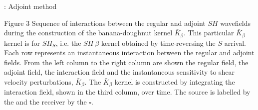 

\begin{frame}[c]{\titleprefix: Adjoint method}

  \centering

  \begin{minipage}{0.5\textwidth}
  \end{minipage}
  \hspace{0.5cm}
  \begin{minipage}{0.42\textwidth}
    \tiny
    \begin{figureblock}{Figure 3}
      Sequence of interactions between the regular and adjoint $SH$ wavefields
      during the construction of the banana-doughnut kernel $\bar K_{\beta}$.
      This particular $\bar K_{\beta}$ kernel is for $SH_S$, i.e.
      the $SH~\beta$ kernel obtained by time-reversing the $S$ arrival.
      Each row represents an instantaneous interaction between the regular and
      adjoint fields.
      From the left column to the right column are shown the regular field,
      the adjoint field, the interaction field and the instantaneous sensitivity
      to shear velocity perturbations, $\bar K_{\beta}$.
      The $\bar K_{\beta}$ kernel is constructed by integrating the interaction
      field, shown in the third column, over time.
      The source is labelled by the \faStarO{} and
      the receiver by the $\square$.
    \end{figureblock}
  \end{minipage}

\end{frame}

